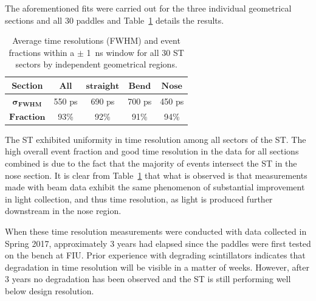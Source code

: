 
The aforementioned fits were carried out for the three individual geometrical sections and all 30 paddles and  Table~\ref{tab:time_res_section} details the results.
	\begin{table}[htbp]
		\centering
		\begin{tabular}{|c|c|c|c|c|}
			\hline  \textbf{Section} & $\mathbf{All}$ & $\mathbf{straight}$ & $\mathbf{Bend}$ & $\mathbf{Nose}$ \\ 
			\hline $\mathbf{\sigma_{FWHM}}$ & 550 ps & 690 ps & 700 ps & 450 ps \\
			\hline $\mathbf{Fraction}$ & 93\% & 92\% & 91\% &  94\% \\ 
			\hline 
		\end{tabular}
		\caption{Average time resolutions (FWHM) and event fractions within a $\pm$ 1~ns window for all 30 ST sectors by independent geometrical regions.}
		\label{tab:time_res_section}
	\end{table}

The ST exhibited uniformity in time resolution among all sectors of the ST. The high overall event fraction and good time resolution in the data for all sections combined is due to the fact that the majority of events intersect the ST in the nose section. 
It is clear from Table~\ref{tab:time_res_section} that what is observed is that measurements made with beam data exhibit the same phenomenon of substantial improvement in light collection, and thus time resolution, as light is produced further downstream in the nose region.

When these time resolution measurements were conducted with data collected in Spring 2017, approximately 3 years had elapsed since the paddles were first tested on the bench at FIU.  Prior experience with degrading scintillators indicates that degradation in time resolution will be visible in a matter of weeks.  However, after 3 years no degradation has been observed and the ST is still performing well below design resolution.